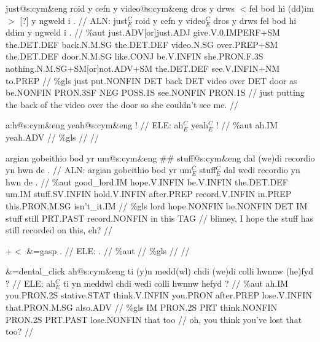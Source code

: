 \documentclass[a4paper,10pt]{article}
\begin{document}
\ex
\begingl[lingstyle=gergl]
\glchat just@s:cym\&eng roid y cefn y video@s:cym\&eng dros y drws $<$fel bod hi (dd)im$>$ [?] y ngweld i . //
\glsurface ALN:  just$^{C}_{E}$ roid y cefn y video$^{C}_{E}$ dros y drws fel bod hi ddim y ngweld i .  //
\glauto \%aut  just{\scriptsize .ADV[or]just.ADJ} give{\scriptsize .V.0.IMPERF+SM} the{\scriptsize .DET.DEF} back{\scriptsize .N.M.SG} the{\scriptsize .DET.DEF} video{\scriptsize .N.SG} over{\scriptsize .PREP+SM} the{\scriptsize .DET.DEF} door{\scriptsize .N.M.SG} like{\scriptsize .CONJ} be{\scriptsize .V.INFIN} she{\scriptsize .PRON.F.3S} nothing{\scriptsize .N.M.SG+SM[or]not.ADV+SM} the{\scriptsize .DET.DEF} see{\scriptsize .V.INFIN+NM} to{\scriptsize .PREP}   //
\glmanual \%gls  just put{\scriptsize .NONFIN} DET back DET video over DET door as be{\scriptsize .NONFIN} PRON{\scriptsize .3SF} NEG POSS{\scriptsize .1S} see{\scriptsize .NONFIN} PRON{\scriptsize .1S}   //
\gleng just putting the back of the video over the door so she couldn't see me. //
\endgl
\xe

\ex
\begingl[lingstyle=gergl]
\glchat a:h@s:cym\&eng yeah@s:cym\&eng ! //
\glsurface ELE:  ah$^{C}_{E}$ yeah$^{C}_{E}$ !  //
\glauto \%aut  ah{\scriptsize .IM} yeah{\scriptsize .ADV}   //
\glmanual \%gls      //
\gleng  //
\endgl
\xe

\ex
\begingl[lingstyle=gergl]
\glchat argian gobeithio bod yr um@s:cym\&eng \#\# stuff@s:cym\&eng dal (we)di recordio yn hwn de . //
\glsurface ALN:  argian gobeithio bod yr um$^{C}_{E}$ stuff$^{C}_{E}$ dal wedi recordio yn hwn de .  //
\glauto \%aut  good\_lord{\scriptsize .IM} hope{\scriptsize .V.INFIN} be{\scriptsize .V.INFIN} the{\scriptsize .DET.DEF} um{\scriptsize .IM} stuff{\scriptsize .SV.INFIN} hold{\scriptsize .V.INFIN} after{\scriptsize .PREP} record{\scriptsize .V.INFIN} in{\scriptsize .PREP} this{\scriptsize .PRON.M.SG} isn't\_it{\scriptsize .IM}   //
\glmanual \%gls  lord hope{\scriptsize .NONFIN} be{\scriptsize .NONFIN} DET IM stuff still PRT{\scriptsize .PAST} record{\scriptsize .NONFIN} in this TAG   //
\gleng blimey, I hope the stuff has still recorded on this, eh? //
\endgl
\xe

\ex
\begingl[lingstyle=gergl]
\glchat +$<$ \&=gasp . //
\glsurface ELE:  .  //
\glauto \%aut    //
\glmanual \%gls    //
\gleng  //
\endgl
\xe

\ex
\begingl[lingstyle=gergl]
\glchat \&=dental\_click ah@s:cym\&eng ti (y)n medd(wl) chdi (we)di colli hwnnw (he)fyd ? //
\glsurface ELE:  ah$^{C}_{E}$ ti yn meddwl chdi wedi colli hwnnw hefyd ?  //
\glauto \%aut  ah{\scriptsize .IM} you{\scriptsize .PRON.2S} stative{\scriptsize .STAT} think{\scriptsize .V.INFIN} you{\scriptsize .PRON} after{\scriptsize .PREP} lose{\scriptsize .V.INFIN} that{\scriptsize .PRON.M.SG} also{\scriptsize .ADV}   //
\glmanual \%gls  IM PRON{\scriptsize .2S} PRT think{\scriptsize .NONFIN} PRON{\scriptsize .2S} PRT{\scriptsize .PAST} lose{\scriptsize .NONFIN} that too   //
\gleng oh, you think you've lost that too? //
\endgl
\xe
\end{document}
